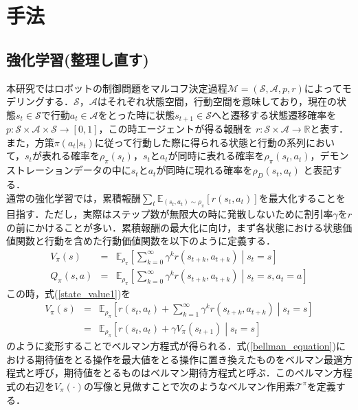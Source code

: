\documentclass[dvipdfmx]{ampbt_nomag}
\begin{document}
\section{手法}\label{sec-method}
\subsection{強化学習(整理し直す)}
本研究ではロボットの制御問題をマルコフ決定過程$\mathcal{M} = (\mathcal{S},\mathcal{A},p,r)$によってモデリングする．$\mathcal{S}$，$\mathcal{A}$はそれぞれ状態空間，行動空間を意味しており，現在の状態$s_t \in \mathcal{S}$で行動$a_t \in \mathcal{A}$をとった時に状態$s_{t+1}\in\mathcal{S}$へと遷移する状態遷移確率を$ p:\mathcal{S}\times\mathcal{A}\times\mathcal{S}\rightarrow[0,1]$，この時エージェントが得る報酬を $r:\mathcal{S}\times\mathcal{A}\rightarrow\mathbb{R}$と表す．また，方策$\pi(a_t|s_t)$に従って行動した際に得られる状態と行動の系列において，$s_t$が表れる確率を$\rho_\pi(s_t)$，$s_t$と$a_t$が同時に表れる確率を$\rho_\pi(s_t,a_t)$，デモンストレーションデータの中に$s_t$と$a_t$が同時に現れる確率を$\rho_D(s_t,a_t)$ と表記する．\\
通常の強化学習では，累積報酬$\sum_t \mathbb{E}_{(s_t,a_t)\sim\rho_\pi}[r(s_t, a_t)]$を最大化することを目指す．ただし，実際はステップ数が無限大の時に発散しないために割引率$\gamma$を$r$の前にかけることが多い．累積報酬の最大化に向け，まず各状態における状態価値関数と行動を含めた行動価値関数を以下のように定義する．
\begin{eqnarray} \label{state_value1}
  V_\pi(s) &=& \mathbb{E}_{\rho_\pi} \left[\sum^{\infty}_{k=0}\gamma^kr(s_{t+k},a_{t+k}) \middle|s_t = s\right] \\
  \label{state_value2}
  Q_\pi(s,a) &=& \mathbb{E}_{\rho_\pi} \left[\sum^{\infty}_{k=0}\gamma^kr(s_{t+k},a_{t+k}) \middle|s_t = s, a_t = a \right]
\end{eqnarray}
この時，式(\ref{state_value1})を
\begin{eqnarray} \label{bellman_equation}
  V_\pi(s) &=& \mathbb{E}_{\rho_\pi} \left[ r(s_t,a_t) + \sum^{\infty}_{k=1} \gamma^{k}r(s_{t+k},a_{t+k}) \middle|s_t = s\right] \\ \nonumber
  &=& \mathbb{E}_{\rho_\pi} \left[ r(s_t,a_t) + \gamma V_\pi(s_{t+1}) \middle|s_t = s\right]
\end{eqnarray}
のように変形することでベルマン方程式が得られる．式(\ref{bellman_equation})における期待値をとる操作を最大値をとる操作に置き換えたものをベルマン最適方程式と呼び，期待値をとるものはベルマン期待方程式と呼ぶ．このベルマン方程式の右辺を$V_\pi(\cdot)$の写像と見做すことで次のようなベルマン作用素$\mathcal{T}^\pi$を定義する．
\end{document}
